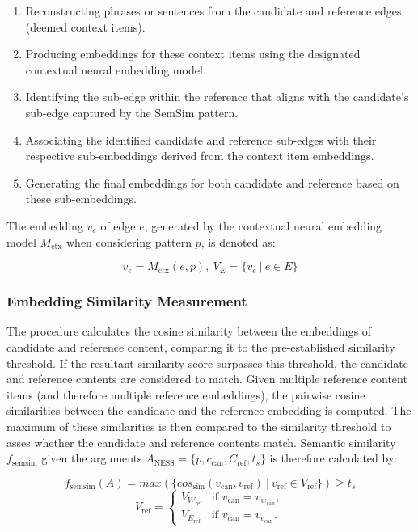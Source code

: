 \documentclass[11pt, numbers=noenddot]{scrreprt}
\begin{document}
\begin{enumerate}
	\item Reconstructing phrases or sentences from the candidate and reference edges (deemed context items).
    \item Producing embeddings for these context items using the designated contextual neural embedding model.
    \item Identifying the sub-edge within the reference that aligns with the candidate's sub-edge captured by the SemSim pattern.
    \item Associating the identified candidate and reference sub-edges with their respective sub-embeddings derived from the context item embeddings.
    \item Generating the final embeddings for both candidate and reference based on these sub-embeddings.
\end{enumerate}

The embedding \(v_e\) of edge \(e\), generated by the contextual neural embedding model \(M_\text{ctx}\) when considering pattern \(p\), is denoted as:


\[v_e = M_\text{ctx}(e, p),\ V_E = \{v_e\ |\ e \in E\} \]

    
\subsubsection{Embedding Similarity Measurement}
The procedure calculates the cosine similarity between the embeddings of candidate and reference content, comparing it to the pre-established similarity threshold. If the resultant similarity score surpasses this threshold, the candidate and reference contents are considered to match. Given multiple reference content items (and therefore multiple reference embeddings), the pairwise cosine similarities between the candidate and the reference embedding is computed. The maximum of these similarities is then compared to the similarity threshold to asses whether the candidate and reference contents match. Semantic similarity \(f_\text{semsim}\) given the arguments \(A_\text{NESS} = \{p, c_\text{can}, C_\text{ref}, t_s\}\) is therefore calculated by:

\[f_\text{semsim}(A) = max(\{cos_\text{sim}(v_\text{can}, v_\text{ref})\ |\ v_\text{ref} \in V_\text{ref} \}) \geq t_s  \]
\[
V_\text{ref} = 
\begin{cases} 
V_{W_\text{ref}} & \text{if } v_\text{can} = v_{w_\text{can}}, \\
V_{E_\text{ref}} & \text{if } v_\text{can} = v_{e_\text{can}}.
\end{cases}
\]
\end{document}
